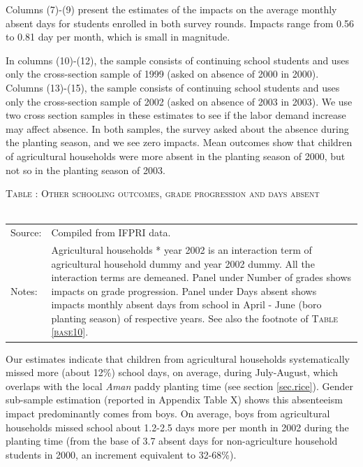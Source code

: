 \documentclass[12pt,letterpaper]{article}\usepackage[margin=1in]{geometry}
\newcommand{\0}{\ensuremath{\mbox{\boldmath $0$}}}
\begin{document}
Columns (7)-(9) present the estimates of the impacts on the average monthly absent days for students enrolled in both survey rounds. Impacts range from 0.56 to 0.81 day per month, which is small in magnitude. 

In columns (10)-(12), the sample consists of continuing school students and uses only the cross-section sample of 1999 (asked on absence of 2000 in 2000). Columns (13)-(15), the sample consists of continuing school students and uses only the cross-section sample of 2002 (asked on absence of 2003 in 2003). We use two cross section samples in these estimates to see if the labor demand increase may affect absence. In both samples, the survey asked about the absence during the planting season, and we see zero impacts. Mean outcomes show that children of agricultural households were more absent in the planting season of 2000, but not so in the planting season of 2003. 

\begin{table}\hfil\textsc{\footnotesize Table \thetable: Other schooling outcomes, grade progression and days absent\label{NumGradesDaysAbsentResults}}\\\setlength{\tabcolsep}{.5pt}\renewcommand{\arraystretch}{.675}\hspace{-2em}\hfil\\\renewcommand{\arraystretch}{1}
\hfil\begin{tabular}{>{\hfill\scriptsize}p{1cm}<{}>{\scriptsize}p{12cm}<{\hfill}} 
Source:& Compiled from IFPRI data. \\[-1ex] 
Notes:&  \textsf{Agricultural households * year 2002} is an interaction term of agricultural household dummy and year 2002 dummy. All the interaction terms are demeaned. Panel under Number of grades shows impacts on grade progression. Panel under Days absent shows impacts monthly absent days from school in April - June (boro planting season) of respective years. See also the footnote of \textsc{\footnotesize Table \ref{base10}}. 
\end{tabular} \end{table}

Our estimates indicate that children from agricultural households systematically missed more (about 12\%) school days, on average, during July-August, which overlaps with the local \textit{Aman} paddy planting time (see section \ref{sec.rice}). Gender sub-sample estimation (reported in Appendix Table X) shows this absenteeism impact predominantly comes from boys. On average, boys from agricultural households missed school about 1.2-2.5 days more per month in 2002 during the planting time (from the base of 3.7 absent days for non-agriculture household students in 2000, an increment equivalent to 32-68\%). 
\end{document}
